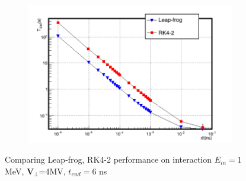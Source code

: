 \documentclass[a4paper,oneside,12pt]{report}
\numberwithin{equation}{chapter}
\begin{document}
{\begin{figure}[H]
    \begin{subfigure}{0.9\textwidth}
        \centering
        \includegraphics[width=\linewidth]{./figures/analiz/90staticE_lf_rk2_dt-Tsim.png}
    \end{subfigure}
    \caption{Comparing Leap-frog, RK4-2 performance on \eE interaction $E_{in}=1$MeV, $\textbf{V}_{\perp}$=4MV, $t_{end}=6$ ns}
    \label{fig:lf_rk2_perp_stat_E_comparison}
\end{figure} \fi
\begin{figure}[H]
    \centering
    \vspace{15pt}

\end{figure}}
\end{document}
